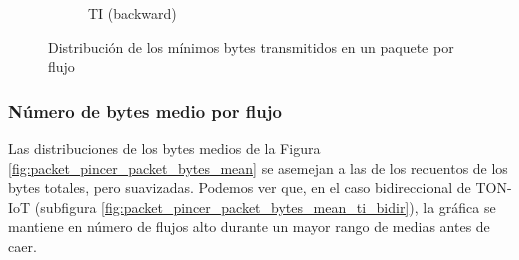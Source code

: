 \begin{figure}[H]
\begin{subfigure}[b]{0.26\textwidth}
        \caption{TI (backward)}
    \end{subfigure}
    \hfill
       \caption{Distribución de los mínimos bytes transmitidos en un paquete por flujo}
       \label{fig:packet_pincer_packet_bytes_min}
\end{figure}

\subsubsection{Número de bytes medio por flujo}

Las distribuciones de los bytes medios de la Figura \ref{fig:packet_pincer_packet_bytes_mean} se asemejan a las de los recuentos de los bytes totales, pero suavizadas. Podemos ver que, en el caso bidireccional de TON-IoT (subfigura \ref{fig:packet_pincer_packet_bytes_mean_ti_bidir}), la gráfica se mantiene en número de flujos alto durante un mayor rango de medias antes de caer.

